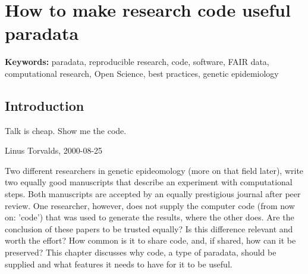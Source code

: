 \chapter{How to make research code useful paradata}


{\bf Keywords:} paradata, reproducible research, code, software,
FAIR data, computational research, Open Science, best practices,
genetic epidemiology

\section{Introduction}

\epigraph{
  Talk is cheap. Show me the code.
}{
  Linus Torvalds, 2000-08-25
}


Two different researchers in genetic epideomology (more on that field later), 
write two equally good manuscripts
that describe an experiment with computational steps.
Both manuscripts are accepted by an equally prestigious journal after peer review. 
One researcher, however, does not supply the
computer code (from now on: 'code') that was used to generate the results,
where the other does.
Are the conclusion of these papers to be trusted equally?
Is this difference relevant and worth the effort?
How common is it to share code, and, if shared, how can it be preserved?
This chapter discusses why code, a type of paradata, 
should be supplied and what features it needs to have
for it to be useful.



